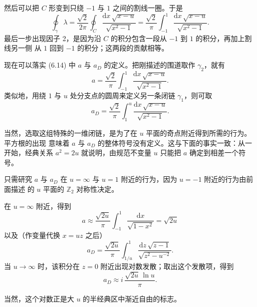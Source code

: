 \documentclass[11pt,a4paper,UTF8,fontset=fandol]{ctexart}
\theoremstyle{plain}
\theoremstyle{definition}
\newcommand{\Z}{\mathbb{Z}}
\newcommand{\dd}{\mathrm{d}}
\begin{document}
然后可以把 $C$ 形变到只绕 $-1$ 与 $1$ 之间的割线一圈。于是
\begin{equation}
  \oint_\gamma\lambda=\frac{\sqrt2}{2\pi}\oint_C\frac{\dd x\,\sqrt{x-u}}{\sqrt{x^2-1}}
  =\frac{\sqrt2}{\pi}\int_{-1}^{1}\frac{\dd x\,\sqrt{x-u}}{\sqrt{x^2-1}}. \tag{6.21}
\end{equation}
最后一步出现因子 2，是因为沿 $C$ 的积分包含一段从 $-1$ 到 $1$ 的积分，再加上割线另一侧
从 $1$ 回到 $-1$ 的积分；这两段的贡献相等。

现在可以落实 (6.14) 中 $a$ 与 $a_D$ 的定义。把刚描述的围道取作 $\gamma_2$，就有
\begin{equation}
  a=\frac{\sqrt2}{\pi}\int_{-1}^{1}\frac{\dd x\,\sqrt{x-u}}{\sqrt{x^2-1}}. \tag{6.22}
\end{equation}
类似地，用绕 $1$ 与 $u$ 处分支点的圆周来定义另一条闭链 $\gamma_1$，则可取
\begin{equation}
  a_D=\frac{\sqrt2}{\pi}\int_{1}^{u}\frac{\dd x\,\sqrt{x-u}}{\sqrt{x^2-1}}. \tag{6.23}
\end{equation}

当然，选取这组特殊的一维闭链，是为了在 $u$ 平面的奇点附近得到所需的行为。平方根的出现
意味着 $a$ 与 $a_D$ 的整体符号没有定义。这与下面的事实一致：从一开始，经典关系 $a^2=2u$
就说明，由规范不变量 $u$ 只能把 $a$ 确定到相差一个符号。

只需研究 $a$ 与 $a_D$ 在 $u=\infty$ 与 $u=1$ 附近的行为，因为 $u=-1$ 附近的行为由前面描述
的 $u$ 平面的 $\Z_2$ 对称性决定。

在 $u=\infty$ 附近，得到
\begin{equation}
  a\approx\frac{\sqrt{2u}}{\pi}\int_{-1}^{1}\frac{\dd x}{\sqrt{1-x^2}}=\sqrt{2u} \tag{6.24}
\end{equation}
以及（作变量代换 $x=uz$ 之后）
\begin{equation}
  a_D=\frac{\sqrt{2u}}{\pi}\int_{1/u}^{1}\frac{\dd z\,\sqrt{z-1}}{\sqrt{z^2-u^{-2}}}. \tag{6.25}
\end{equation}
当 $u\to\infty$ 时，该积分在 $z=0$ 附近出现对数发散；取出这个发散项，得到
\begin{equation}
  a_D\approx i\,\frac{\sqrt{2u}\,\ln u}{\pi}. \tag{6.26}
\end{equation}

当然，这个对数正是大 $u$ 的半经典区中渐近自由的标志。
\end{document}
